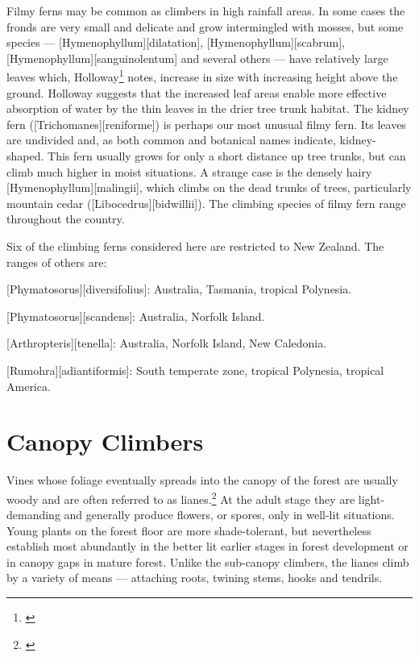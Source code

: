 Filmy ferns may be common as climbers in high rainfall areas.
In some cases the fronds are very small and delicate and grow intermingled with mosses, but some species --- [Hymenophyllum][dilatation], [Hymenophyllum][scabrum], [Hymenophyllum][sanguinolentum] and several others --- have relatively large leaves which, Holloway\footnote{\cite{holloway1923studies}} notes, increase in size with increasing height above the ground.
Holloway suggests that the increased leaf areas enable more effective absorption of water by the thin leaves in the drier tree trunk habitat.
The kidney fern ([Trichomanes][reniforme]) is perhaps our most unusual filmy fern.
Its leaves are undivided and, as both common and botanical names indicate, kidney-shaped.
This fern usually grows for only a short distance up tree trunks, but can climb much higher in moist situations.
A strange case is the densely hairy [Hymenophyllum][malingii], which climbs on the dead trunks of trees, particularly mountain cedar ([Libocedrus][bidwillii]).
The climbing species of filmy fern range throughout the country.

Six of the climbing ferns considered here are restricted to New Zealand.
The ranges of others are:

[Phymatosorus][diversifolius]: Australia, Tasmania, tropical Polynesia.

[Phymatosorus][scandens]: Australia, Norfolk Island.

[Arthropteris][tenella]: Australia, Norfolk Island, New Caledonia.

[Rumohra][adiantiformis]: South temperate zone, tropical Polynesia, tropical America.

\section{Canopy Climbers}

Vines whose foliage eventually spreads into the canopy of the forest are usually woody and are often referred to as lianes.\footnote{\cite{bird1916observations}}
At the adult stage they are light-demanding and generally produce flowers, or spores, only in well-lit situations.
Young plants on the forest floor are more shade-tolerant, but nevertheless establish most abundantly in the better lit earlier stages in forest development or in canopy gaps in mature forest.
Unlike the sub-canopy climbers, the lianes climb by a variety of means --- attaching roots, twining stems, hooks and tendrils.

